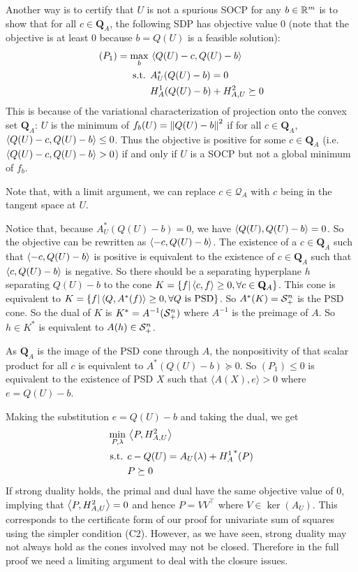 \documentclass[11pt]{article}
\newcommand{\error}{e}
\newcommand{\APsd}{\mathbf{Q}_A}
\begin{document}
Another way is to certify that $U$ is not a spurious SOCP for any $b \in \mathbb{R}^m$
is to show that for all $c \in \APsd$, the following SDP has objective
value 0 (note that the objective is at least 0 because $b = Q(U)$ is a feasible
solution):
\begin{align*}
  (P_1) = \max_b \, & \left\langle Q(U) - c, Q(U) - b \right\rangle \\
  \text{s.t. } & A_U^*(Q(U) - b) = 0 \\
         & H^1_A(Q(U) - b) + H^2_{A, U} \succeq 0
\end{align*}
This is because of the variational characterization of projection onto the
convex set $\APsd$: $U$ is the minimum of $f_b(U) = \left\lVert Q(U) - b \right\lVert^2$ if for
all $c \in \APsd$, $\left\langle Q(U) - c, Q(U) - b \right\rangle \le 0$. Thus the objective is
positive for some $c \in \APsd$ (i.e.  $\left\langle Q(U) - c, Q(U) - b \right\rangle > 0 $) if and
only if $U$ is a SOCP but not a global minimum of $f_b$.

Note that, with a limit argument, we can replace $c \in \mathcal{Q}_A$ with $c$
being in the tangent space at $U$.

Notice that, because $A_U^*(Q(U) - b) = 0$, we have $\left\langle Q(U), Q(U) - b \right\rangle = 0$.
So the objective can be rewritten as $\left\langle -c, Q(U) - b \right\rangle$.  The existence of a
$c \in \APsd$ such that $\left\langle -c, Q(U) - b \right\rangle$ is positive is equivalent to the
existence of $c \in \APsd$ such that $\left\langle c, Q(U) - b \right\rangle$ is negative.  So there
should be a separating hyperplane $h$ separating $Q(U) - b$ to the cone
$K = \{f | \dotp{c, f} \ge 0, \forall c \in \APsd \}$.  This cone is equivalent
to $K = \{f | \left\langle Q, A^*(f) \right\rangle \ge 0, \forall Q \text{ is PSD}\}$.  So
$A^*(K) = \mathcal{S}^{n}_+$ is the PSD cone.  So the dual of $K$ is $K^* = A^{-1}(\mathcal{S}^{n}_+)$
where $A^{-1}$ is the preimage of $A$.  So $h \in K^*$ is equivalent to
$A(h) \in \mathcal{S}^{n}_+$.

As $\APsd$ is the image of the PSD cone through $A$, the nonpositivity of that
scalar product for all $c$ is equivalent to $A^*(Q(U) - b) \succeq 0$.  So
$(P_1) \le 0$ is equivalent to the existence of PSD $X$ such that
$\langle A(X), e \rangle > 0$ where $\error = Q(U) - b$.

Making the substitution $\error = Q(U) - b$ and taking the dual, we
get
\begin{align*}
  \min_{P, \lambda} \, & \left\langle P, H^2_{A, U} \right\rangle \\
  \text{s.t. } & c - Q(U) = A_U(\lambda) + {H^1_A}^*(P) \\
                      & P \succeq 0
\end{align*}
If strong duality holds, the primal and dual have the same objective value of 0,
implying that $\left\langle P, H^2_{A, U} \right\rangle = 0$ and hence $P = VV^\top$ where
$V \in \ker(A_U)$.  This corresponds to the certificate form of our proof for
univariate sum of squares using the simpler condition (C2). However, as we have
seen, strong duality may not always hold as the cones involved may not be
closed. Therefore in the full proof we need a limiting argument to deal with the
closure issues.



\end{document}

